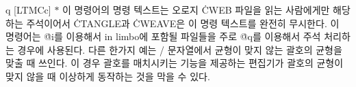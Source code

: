 \@{q} [LTMCc] $*$ 이 명령어의 명령 텍스트는 오로지
\.{CWEB} 파일을 읽는 사람에게만 해당하는 주석이어서 \.{CTANGLE}과
\.{CWEAVE}은 이 명령 텍스트를 완전히 무시한다.
이 명령어는 \.{@i}를 이용해서 in limbo에 포함될 파일들을 주로 \.{@q}를
이용해서 주석 처리하는 경우에 사용된다. 다른 한가지 예는 \CEE/
문자열에서 균형이 맞지 않는 괄호의 균형을 맞출 때 쓰인다. 이 경우 괄호를
매치시키는 기능을 제공하는 편집기가 괄호의 균형이 맞지 않을 때 이상하게
동작하는 것을 막을 수 있다. 
 
